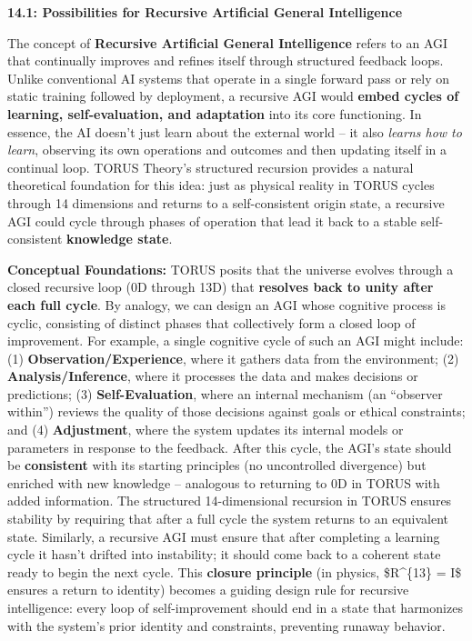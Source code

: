 \documentclass[]{article}
\begin{document}
\textbf{14.1: Possibilities for Recursive Artificial General
Intelligence}

The concept of \textbf{Recursive Artificial General Intelligence} refers
to an AGI that continually improves and refines itself through
structured feedback loops. Unlike conventional AI systems that operate
in a single forward pass or rely on static training followed by
deployment, a recursive AGI would \textbf{embed cycles of learning,
self-evaluation, and adaptation} into its core functioning. In essence,
the AI doesn't just learn about the external world -- it also
\emph{learns how to learn}, observing its own operations and outcomes
and then updating itself in a continual loop. TORUS Theory's structured
recursion provides a natural theoretical foundation for this idea: just
as physical reality in TORUS cycles through 14 dimensions and returns to
a self-consistent origin state, a recursive AGI could cycle through
phases of operation that lead it back to a stable self-consistent
\textbf{knowledge state}.

\textbf{Conceptual Foundations:} TORUS posits that the universe evolves
through a closed recursive loop (0D through 13D) that \textbf{resolves
back to unity after each full cycle}. By analogy, we can design an AGI
whose cognitive process is cyclic, consisting of distinct phases that
collectively form a closed loop of improvement. For example, a single
cognitive cycle of such an AGI might include: (1)
\textbf{Observation/Experience}, where it gathers data from the
environment; (2) \textbf{Analysis/Inference}, where it processes the
data and makes decisions or predictions; (3) \textbf{Self-Evaluation},
where an internal mechanism (an ``observer within'') reviews the quality
of those decisions against goals or ethical constraints; and (4)
\textbf{Adjustment}, where the system updates its internal models or
parameters in response to the feedback. After this cycle, the AGI's
state should be \textbf{consistent} with its starting principles (no
uncontrolled divergence) but enriched with new knowledge -- analogous to
returning to 0D in TORUS with added information. The structured
14-dimensional recursion in TORUS ensures stability by requiring that
after a full cycle the system returns to an equivalent state. Similarly,
a recursive AGI must ensure that after completing a learning cycle it
hasn't drifted into instability; it should come back to a coherent state
ready to begin the next cycle. This \textbf{closure principle} (in
physics, \$R\^{}\{13\} = I\$ ensures a return to identity) becomes a
guiding design rule for recursive intelligence: every loop of
self-improvement should end in a state that harmonizes with the system's
prior identity and constraints, preventing runaway behavior.
\end{document}
